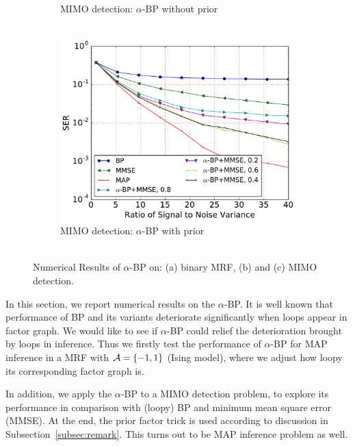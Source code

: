 \documentclass{article}
\begin{document}
\begin{figure}[!h]
\begin{subfigure}{.5\textwidth}
    \vspace{-0.6cm}
    \caption{MIMO detection: $\alpha$-BP without prior\\~}\label{fig:mimo_a}
  \end{subfigure}
  \begin{subfigure}{.5\textwidth}
    \includegraphics[width=1\linewidth]{figures/prior_mmse_alpha_compare_crop.pdf}
    \vspace{-0.6cm}
    \caption{MIMO detection: $\alpha$-BP with prior\\~}\label{fig:mimo_b}
  \end{subfigure}
  \vspace{-0.3cm}
  \caption{Numerical Results of $\alpha$-BP on: (a) binary MRF, (b) and (c) MIMO detection.}
  \vspace{0.3cm}
  \label{fig:mimo_detection}
\end{figure}

In this section, we report numerical results on the $\alpha$-BP. It is well known that performance of BP and its variants deteriorate significantly when loops appear in factor graph. We would like to see if $\alpha$-BP could relief the deterioration brought by loops in inference. Thus we firstly test the performance of $\alpha$-BP for MAP inference in a MRF with $\mathcal{A}=\{-1,1\}$ (Ising model), where we adjust how loopy its corresponding factor graph is.



In addition, we apply the $\alpha$-BP to a MIMO detection problem, to explore its performance in comparison with (loopy) BP and minimum mean square error (MMSE). At the end, the prior factor trick is used according to discussion in Subsection~\ref{subsec:remark}. This turns out to be MAP inference problem as well.
\end{document}

